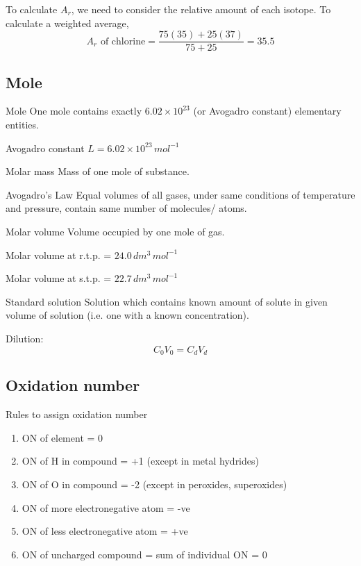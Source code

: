 \begin{solution}
To calculate $A_r$, we need to consider the relative amount of each isotope. To calculate a weighted average,
\[ A_r\text{ of chlorine} = \frac{75(35)+25(37)}{75+25} = \boxed{35.5} \]
\end{solution}

\subsection{Mole}
\begin{defn}{Mole}{}
One mole contains exactly $6.02 \times 10^{23}$ (or Avogadro constant) elementary entities.
\end{defn}

Avogadro constant $L=6.02 \times 10^{23}\,\unit{mol^{-1}}$ 

\begin{defn}{Molar mass}{}
Mass of one mole of substance.
\end{defn}

\begin{defn}{Avogadro’s Law}{}
Equal volumes of all gases, under same conditions of temperature and pressure, contain same number of molecules/ atoms.
\end{defn}

\begin{defn}{Molar volume}{}
Volume occupied by one mole of gas.
\end{defn}

Molar volume at r.t.p. = $24.0\,\unit{dm^3\,mol^{-1}}$

Molar volume at s.t.p. = $22.7\,\unit{dm^3\,mol^{-1}}$

\begin{defn}{Standard solution}{}
Solution which contains known amount of solute in given volume of solution (i.e. one with a known concentration).
\end{defn}

Dilution:
\begin{equation}
C_0V_0 = C_dV_d
\end{equation}

\subsection{Oxidation number}
Rules to assign oxidation number
\begin{enumerate}
\item ON of element = 0
\item ON of H in compound = +1 (except in metal hydrides)
\item ON of O in compound = -2 (except in peroxides, superoxides)
\item ON of more electronegative atom = -ve
\item ON of less electronegative atom = +ve
\item ON of uncharged compound = sum of individual ON = 0
\end{enumerate}

